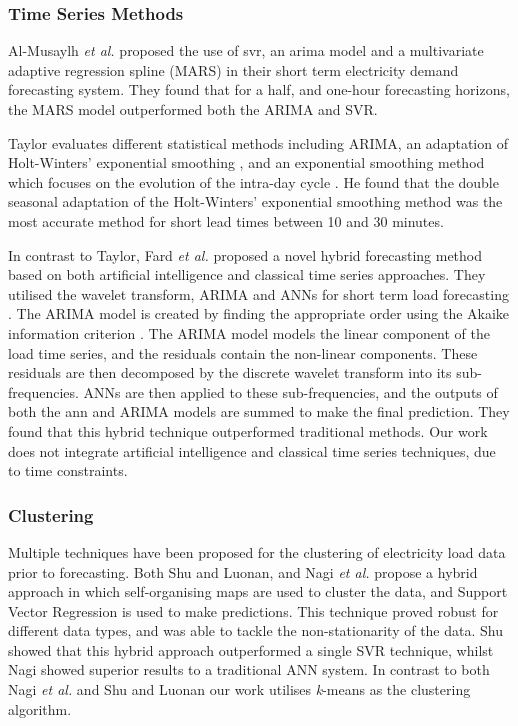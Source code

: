 \subsubsection{Time Series Methods}

Al-Musaylh \textit{et al.} \cite{Al-Musaylh2018} proposed the use of \acrfull{svr}, an \acrfull{arima} model and a multivariate adaptive regression spline (MARS) in their short term electricity demand forecasting system. They found that for a half, and one-hour forecasting horizons, the MARS model outperformed both the ARIMA and SVR.

Taylor \cite{Taylor2008} evaluates different statistical methods including ARIMA, an adaptation of Holt-Winters' exponential smoothing \cite{Holt2004}, and an exponential smoothing method which focuses on the evolution of the intra-day cycle . He found that the double seasonal adaptation of the Holt-Winters' exponential smoothing method was the most accurate method for short lead times between 10 and 30 minutes. 

In contrast to Taylor, Fard \textit{et al.} \cite{Fard2014} proposed a novel hybrid forecasting method based on both artificial intelligence and classical time series approaches. They utilised the wavelet transform, ARIMA and ANNs for short term load forecasting . The ARIMA model is created by finding the appropriate order using the Akaike information criterion \cite{Akaike1974}. The ARIMA model models the linear component of the load time series, and the residuals contain the non-linear components. These residuals are then decomposed by the discrete wavelet transform into its sub-frequencies. ANNs are then applied to these sub-frequencies, and the outputs of both the \acrfull{ann} and ARIMA models are summed to make the final prediction. They found that this hybrid technique outperformed traditional methods. Our work does not integrate artificial intelligence and classical time series techniques, due to time constraints.

\subsubsection{Clustering}

Multiple techniques have been proposed for the clustering of electricity load data prior to forecasting. Both Shu \cite{Shu2006} and Luonan, and Nagi \textit{et al.} \cite{Tiong2008} propose a hybrid approach in which self-organising maps are used to cluster the data, and Support Vector Regression is used to make predictions. This technique proved robust for different data types, and was able to tackle the non-stationarity of the data. Shu showed that this hybrid approach outperformed a single SVR technique, whilst Nagi showed superior results to a traditional ANN system. In contrast to both Nagi \textit{et al.} and Shu and Luonan our work utilises \textit{k}-means as the clustering algorithm. 

